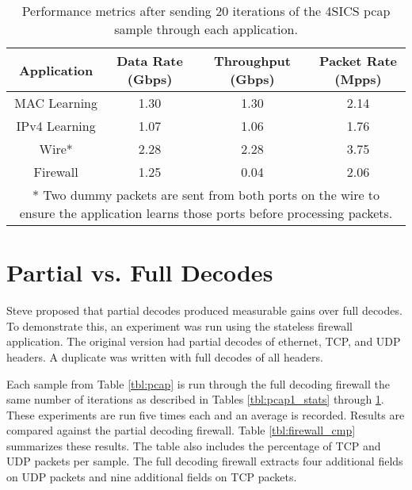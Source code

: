 \begin{table}[ht]
\caption{Performance metrics after sending 20 iterations of the 4SICS pcap sample through each application.}
\begin{center}
\begin{tabularx}{\linewidth}{| c || c | c | c | }
\hline
Application & Data Rate (Gbps) & Throughput (Gbps) & Packet Rate (Mpps) \\
\hline
MAC Learning & 1.30 & 1.30 & 2.14  \\
\hline
IPv4 Learning & 1.07 & 1.06 & 1.76  \\
\hline 
Wire* & 2.28 & 2.28 & 3.75 \\
\hline
Firewall & 1.25 & 0.04 & 2.06 \\
\hline
\multicolumn{4}{p{\linewidth}}{* Two dummy packets are sent from both ports on the wire to ensure the application learns those ports before processing packets.}
\end{tabularx}
\end{center}
\label{tbl:pcap3_stats}
\end{table}

\section{Partial vs. Full Decodes} \label{exp:decode_comparison}

Steve proposed that partial decodes produced measurable gains over full decodes. To demonstrate this, an experiment was run using the stateless firewall application. The original version had partial decodes of ethernet, TCP, and UDP headers. A duplicate was written with full decodes of all headers.

Each sample from Table \ref{tbl:pcap} is run through the full decoding firewall the same number of iterations as described in Tables \ref{tbl:pcap1_stats} through \ref{tbl:pcap3_stats}. These experiments are run five times each and an average is recorded. Results are compared against the partial decoding firewall.
Table \ref{tbl:firewall_cmp} summarizes these results. The table also includes the percentage of TCP and UDP packets per sample. The full decoding firewall extracts four additional fields on UDP packets and nine additional fields on TCP packets. 


